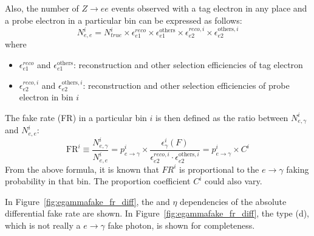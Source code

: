 Also, the number of $Z\to ee$ events observed with a tag electron in any place and a probe electron in a particular bin can be expressed as follows:
\begin{equation}
N_{e,e}^i = N_{true}^i \times \epsilon_{e1}^{reco} \times \epsilon_{e1}^{\mathrm{others}} \times \epsilon_{e2}^{reco,i} \times \epsilon_{e2}^{\mathrm{others},i}
\end{equation}
where
\begin{itemize}
\item $\epsilon_{e1}^{reco}$ and $\epsilon_{e1}^{\mathrm{others}}$: reconstruction and other selection efficiencies of tag electron
\item $\epsilon_{e2}^{reco,i}$ and $\epsilon_{e2}^{\mathrm{others},i}$: reconstruction and other selection efficiencies of probe electron in bin $i$
\end{itemize}

The fake rate (FR) in a particular bin $i$ is then defined as the ratio between $N_{e,\gamma}^i$ and $N_{e,e}^i$:
\begin{equation}
\text{FR}^i \equiv \frac{N_{e,\gamma}^i}{N_{e,e}^i} = p_{e\to\gamma}^i \times \frac{\epsilon_{\gamma}^i(F)}{\epsilon_{e2}^{reco,i} \cdot \epsilon_{e2}^{\mathrm{others},i}} = p_{e\to\gamma}^i \times C^i
\end{equation}
From the above formula, it is known that $FR^i$ is proportional to the $e\to\gamma$ faking probability in that bin. The proportion coefficient $C^i$ could also vary.

In Figure~\ref{fig:egammafake_fr_diff}, the \pt and $\eta$ dependencies of the absolute differential fake rate are shown.  
In Figure~\ref{fig:egammafake_fr_diff}, the type (d), which is not really a $e\rightarrow \gamma$ fake photon, is shown for completeness.

